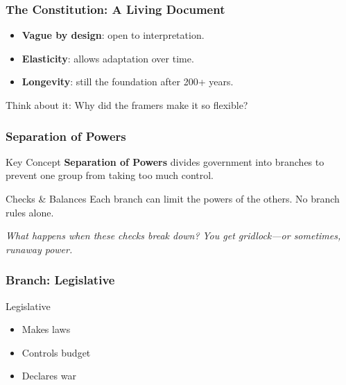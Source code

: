 \documentclass[10pt]{beamer}
\begin{document}
\begin{frame}
\frametitle{The Constitution: A Living Document}

\begin{itemize}
\item<1-> \textbf{Vague by design}: open to interpretation.
\item<2-> \textbf{Elasticity}: allows adaptation over time.
\item<3-> \textbf{Longevity}: still the foundation after 200+ years.
\end{itemize}

\pause
\vspace{1cm}
\begin{alertblock}{Think about it:}
Why did the framers make it so flexible?
\end{alertblock}

\end{frame}

\begin{frame}
\frametitle{Separation of Powers}

\begin{alertblock}{Key Concept}
\textbf{Separation of Powers} divides government into branches to prevent one group from taking too much control.
\end{alertblock}

\pause
\vspace{0.5cm}

\begin{exampleblock}{Checks \& Balances}
Each branch can limit the powers of the others. No branch rules alone.
\end{exampleblock}

\pause
\vspace{0.5cm}

\centering
\emph{What happens when these checks break down?} \pause \emph{You get gridlock---or sometimes, runaway power.}

\end{frame}

\begin{frame}
\frametitle{Branch: Legislative}

\pause
\begin{block}{\textcolor{titanblue}{Legislative}}
\begin{itemize}
\item Makes laws
\item Controls budget
\item Declares war
\end{itemize}
\end{block}

\end{frame}
\end{document}

